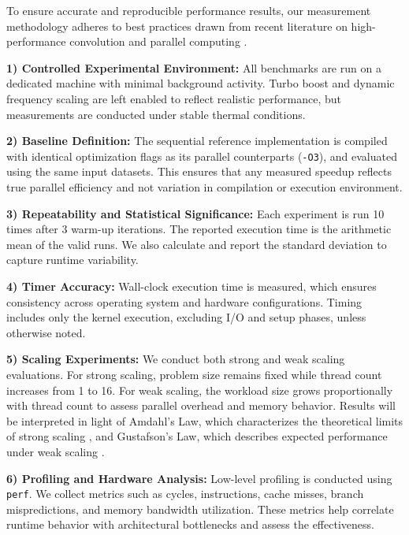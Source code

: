\documentclass[conference, 10pt]{IEEEtran}
\begin{document}
To ensure accurate and reproducible performance results, our measurement methodology adheres to best practices drawn from recent literature on high-performance convolution and parallel computing \cite{Gawrych2023-vu,  Rajput2013-qn,  Yoon2012-sx}.

\vspace{0.5em}
\textbf{1) Controlled Experimental Environment:} All benchmarks are run on a dedicated machine with minimal background activity. Turbo boost and dynamic frequency scaling are left enabled to reflect realistic performance, but measurements are conducted under stable thermal conditions.

\vspace{0.5em}
\textbf{2) Baseline Definition:} The sequential reference implementation is compiled with identical optimization flags as its parallel counterparts (\texttt{-O3}), and evaluated using the same input datasets. This ensures that any measured speedup reflects true parallel efficiency and not variation in compilation or execution environment.

\vspace{0.5em}
\textbf{3) Repeatability and Statistical Significance:} Each experiment is run 10 times after 3 warm-up iterations. The reported execution time is the arithmetic mean of the valid runs. We also calculate and report the standard deviation to capture runtime variability.

\vspace{0.5em}
\textbf{4) Timer Accuracy:} Wall-clock execution time is measured, which ensures consistency across operating system and hardware configurations. Timing includes only the kernel execution, excluding I/O and setup phases, unless otherwise noted.

\vspace{0.5em}
\textbf{5) Scaling Experiments:} 
We conduct both strong and weak scaling evaluations. For strong scaling, problem size remains fixed while thread count increases from 1 to 16. For weak scaling, the workload size grows proportionally with thread count to assess parallel overhead and memory behavior. Results will be interpreted in light of Amdahl’s Law, which characterizes the theoretical limits of strong scaling \cite{hager2021hpc}, and Gustafson’s Law, which describes expected performance under weak scaling \cite{gustafson1988reevaluating}.


\vspace{0.5em}
\textbf{6) Profiling and Hardware Analysis:} Low-level profiling is conducted using \texttt{perf}. We collect metrics such as cycles, instructions, cache misses, branch mispredictions, and memory bandwidth utilization. These metrics help correlate runtime behavior with architectural bottlenecks and assess the effectiveness.
\end{document}
